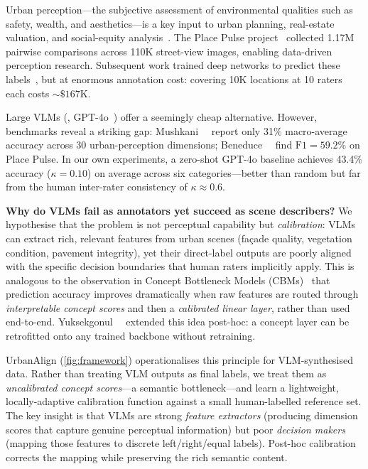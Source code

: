 \documentclass[runningheads]{llncs}
\begin{document}
Urban perception---the subjective assessment of environmental qualities such as safety, wealth, and aesthetics---is a key input to urban planning, real-estate valuation, and social-equity analysis~\cite{lynch1960image,jacobs1961death}.
The Place Pulse project~\cite{salesses2013collaborative} collected 1.17M pairwise comparisons across 110K street-view images, enabling data-driven perception research.
Subsequent work trained deep networks to predict these labels~\cite{dubey2016deep,zhang2018measuring}, but at enormous annotation cost: covering 10K locations at 10 raters each costs ${\sim}\$167$K.

Large VLMs (\eg, GPT-4o~\cite{openai2024gpt4o}) offer a seemingly cheap alternative.
However, benchmarks reveal a striking gap: Mushkani~\etal~\cite{mushkani2025llm} report only 31\% macro-average accuracy across 30 urban-perception dimensions; Beneduce~\etal~\cite{beneduce2025exploring} find $\text{F1}{=}59.2$\% on Place Pulse.
In our own experiments, a zero-shot GPT-4o baseline achieves 43.4\% accuracy ($\kappa{=}0.10$) on average across six categories---better than random but far from the human inter-rater consistency of $\kappa{\approx}0.6$.

\smallskip\noindent\textbf{Why do VLMs fail as annotators yet succeed as scene describers?}
We hypothesise that the problem is not perceptual capability but \emph{calibration}: VLMs can extract rich, relevant features from urban scenes (fa\c{c}ade quality, vegetation condition, pavement integrity), yet their direct-label outputs are poorly aligned with the specific decision boundaries that human raters implicitly apply.
This is analogous to the observation in Concept Bottleneck Models (CBMs)~\cite{koh2020concept} that prediction accuracy improves dramatically when raw features are routed through \emph{interpretable concept scores} and then a \emph{calibrated linear layer}, rather than used end-to-end.
Yuksekgonul~\etal~\cite{yuksekgonul2023posthoc} extended this idea post-hoc: a concept layer can be retrofitted onto any trained backbone without retraining.

UrbanAlign (\cref{fig:framework}) operationalises this principle for VLM-synthesised data.
Rather than treating VLM outputs as final labels, we treat them as \emph{uncalibrated concept scores}---a semantic bottleneck---and learn a lightweight, locally-adaptive calibration function against a small human-labelled reference set.
The key insight is that VLMs are strong \emph{feature extractors} (producing dimension scores that capture genuine perceptual information) but poor \emph{decision makers} (mapping those features to discrete left/right/equal labels).
Post-hoc calibration corrects the mapping while preserving the rich semantic content.
\end{document}
